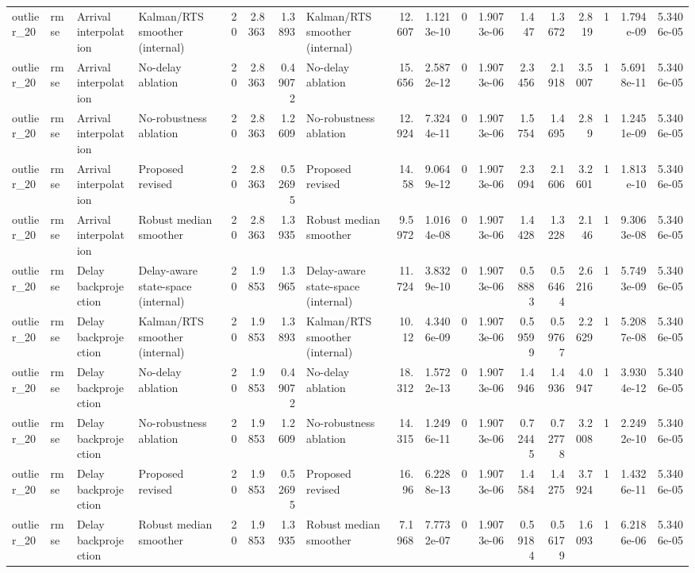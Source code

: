 \begin{table}[!htbp]
{\begin{tabular}{llllrrrlrrrrrrrrrr}
outlier_20 & rmse & Arrival interpolation & Kalman/RTS smoother (internal) & 20 & 2.8363 & 1.3893 & Kalman/RTS smoother (internal) & 12.607 & 1.1213e-10 & 0 & 1.9073e-06 & 1.447 & 1.3672 & 2.819 & 1 & 1.794e-09 & 5.3406e-05 \\
outlier_20 & rmse & Arrival interpolation & No-delay ablation & 20 & 2.8363 & 0.49072 & No-delay ablation & 15.656 & 2.5872e-12 & 0 & 1.9073e-06 & 2.3456 & 2.1918 & 3.5007 & 1 & 5.6918e-11 & 5.3406e-05 \\
outlier_20 & rmse & Arrival interpolation & No-robustness ablation & 20 & 2.8363 & 1.2609 & No-robustness ablation & 12.924 & 7.3244e-11 & 0 & 1.9073e-06 & 1.5754 & 1.4695 & 2.89 & 1 & 1.2451e-09 & 5.3406e-05 \\
outlier_20 & rmse & Arrival interpolation & Proposed revised & 20 & 2.8363 & 0.52695 & Proposed revised & 14.58 & 9.0649e-12 & 0 & 1.9073e-06 & 2.3094 & 2.1606 & 3.2601 & 1 & 1.813e-10 & 5.3406e-05 \\
outlier_20 & rmse & Arrival interpolation & Robust median smoother & 20 & 2.8363 & 1.3935 & Robust median smoother & 9.5972 & 1.0164e-08 & 0 & 1.9073e-06 & 1.4428 & 1.3228 & 2.146 & 1 & 9.3063e-08 & 5.3406e-05 \\
outlier_20 & rmse & Delay backprojection & Delay-aware state-space (internal) & 20 & 1.9853 & 1.3965 & Delay-aware state-space (internal) & 11.724 & 3.8329e-10 & 0 & 1.9073e-06 & 0.58883 & 0.56464 & 2.6216 & 1 & 5.7493e-09 & 5.3406e-05 \\
outlier_20 & rmse & Delay backprojection & Kalman/RTS smoother (internal) & 20 & 1.9853 & 1.3893 & Kalman/RTS smoother (internal) & 10.12 & 4.3406e-09 & 0 & 1.9073e-06 & 0.59599 & 0.59767 & 2.2629 & 1 & 5.2087e-08 & 5.3406e-05 \\
outlier_20 & rmse & Delay backprojection & No-delay ablation & 20 & 1.9853 & 0.49072 & No-delay ablation & 18.312 & 1.5722e-13 & 0 & 1.9073e-06 & 1.4946 & 1.4936 & 4.0947 & 1 & 3.9304e-12 & 5.3406e-05 \\
outlier_20 & rmse & Delay backprojection & No-robustness ablation & 20 & 1.9853 & 1.2609 & No-robustness ablation & 14.315 & 1.2496e-11 & 0 & 1.9073e-06 & 0.72445 & 0.72778 & 3.2008 & 1 & 2.2492e-10 & 5.3406e-05 \\
outlier_20 & rmse & Delay backprojection & Proposed revised & 20 & 1.9853 & 0.52695 & Proposed revised & 16.96 & 6.2288e-13 & 0 & 1.9073e-06 & 1.4584 & 1.4275 & 3.7924 & 1 & 1.4326e-11 & 5.3406e-05 \\
outlier_20 & rmse & Delay backprojection & Robust median smoother & 20 & 1.9853 & 1.3935 & Robust median smoother & 7.1968 & 7.7732e-07 & 0 & 1.9073e-06 & 0.59184 & 0.56179 & 1.6093 & 1 & 6.2186e-06 & 5.3406e-05 \\

\end{tabular}}
\end{table}
